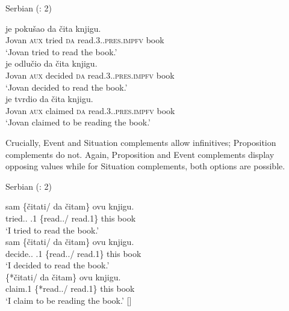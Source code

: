 \documentclass[output=paper]{langscibook}
\begin{document}
\begin{exe}
\ex \label{Paj5} Serbian (\citealt{todorovickwurmbrand2020}: 2)
\begin{xlist}

\ex \label{Paj5a} 
 {je} {pokušao} {da} {čita} {knjigu.}\\
    Jovan \textsc{aux} tried \textsc{da} read.3.{\sg}.\textsc{pres}.\textsc{impfv} book\\
\glt `Jovan tried to read the book.’\\

\ex \label{Paj5b}
 {je} {odlučio} {da} {čita} {knjigu.} \\
    Jovan \textsc{aux} decided \textsc{da} read.3.{\sg}.\textsc{pres}.\textsc{impfv} book\\
\glt `Jovan decided to read the book.’\\

\ex \label{Paj5c}
 {je} {tvrdio} {da} {čita} {knjigu.}\\
    Jovan \textsc{aux} claimed \textsc{da} read.3.{\sg}.\textsc{pres}.\textsc{impfv} book\\
\glt `Jovan claimed to be reading the book.’\\

\end{xlist}
\end{exe}
 

Crucially, Event and Situation complements allow infinitives; Proposition complements do not. Again, Proposition and Event complements display opposing values while for Situation complements, both options are possible. 

\begin{exe}
\ex \label{Paj6} Serbian (\citealt{todorovickwurmbrand2020}: 2)
\begin{xlist}

\ex \label{Paj6a} 
 {sam} \{{čitati/} {da} {čitam}\} {ovu} {knjigu.} \\
    tried.{\sg}. .1{\sg} \{read../  read.1{\sg}\} this book\\
\glt `I tried to read the book.’\\

\ex \label{Paj6b}
 {sam} \{{čitati/} {da} {čitam}\} {ovu} {knjigu.} \\
    decide.{\sg}. .1{\sg} \{read../  read.1{\sg}\} this book\\
\glt `I decided to read the book.’\\

\ex \label{Paj6c}
 \{{*čitati/} {da} {čitam}\} {ovu} {knjigu.} \\
    claim.1{\sg} \{*read../  read.1{\sg}\} this book\\
\glt `I claim to be reading the book.’ [\citealt[305, (22a,b)]{vrzic1994}]\\

\end{xlist}
\end{exe}
 
\end{document}
